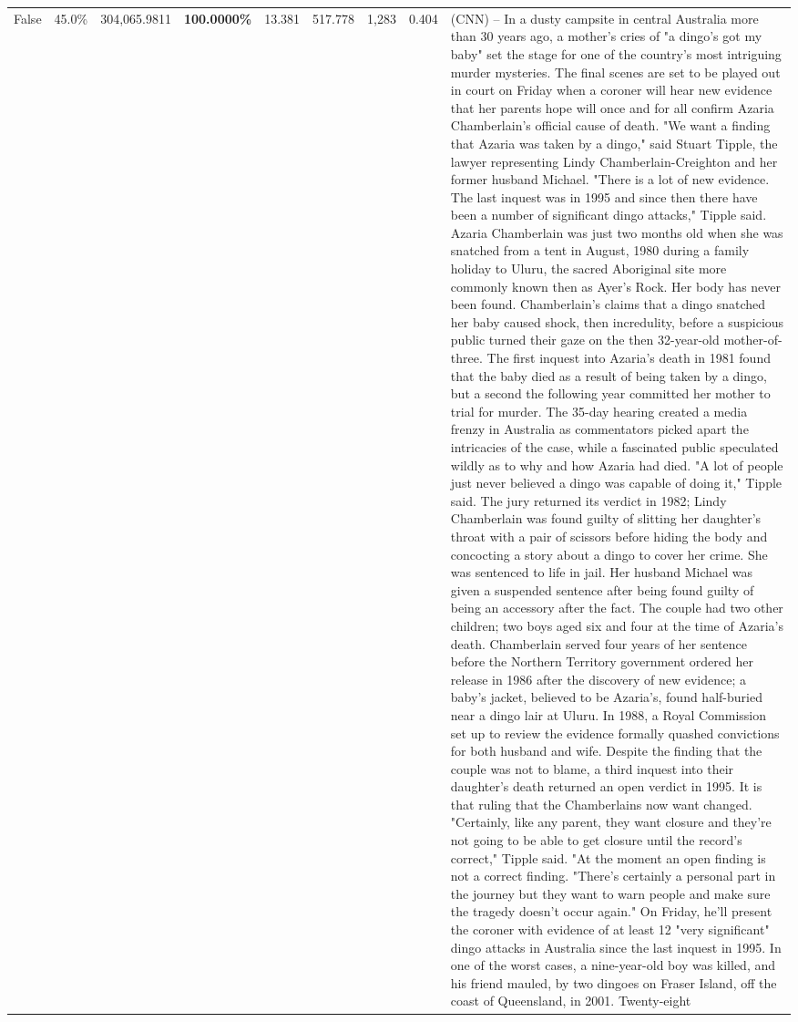 \begin{table}[H]
\begin{tabular}{lllrlllll}
False & 45.0\% & \color{red} 304,065.9811 & \bfseries \color{red} 100.0000\% & 13.381 & 517.778 & 1,283 & 0.404 & (CNN) -- In a dusty campsite in central Australia more than 30 years ago, a mother's cries of "a dingo's got my baby" set the stage for one of the country's most intriguing murder mysteries. The final scenes are set to be played out in court on Friday when a coroner will hear new evidence that her parents hope will once and for all confirm Azaria Chamberlain's official cause of death. "We want a finding that Azaria was taken by a dingo," said Stuart Tipple, the lawyer representing Lindy Chamberlain-Creighton and her former husband Michael. "There is a lot of new evidence. The last inquest was in 1995 and since then there have been a number of significant dingo attacks," Tipple said. Azaria Chamberlain was just two months old when she was snatched from a tent in August, 1980 during a family holiday to Uluru, the sacred Aboriginal site more commonly known then as Ayer's Rock. Her body has never been found. Chamberlain's claims that a dingo snatched her baby caused shock, then incredulity, before a suspicious public turned their gaze on the then 32-year-old mother-of-three. The first inquest into Azaria's death in 1981 found that the baby died as a result of being taken by a dingo, but a second the following year committed her mother to trial for murder. The 35-day hearing created a media frenzy in Australia as commentators picked apart the intricacies of the case, while a fascinated public speculated wildly as to why and how Azaria had died. "A lot of people just never believed a dingo was capable of doing it," Tipple said. The jury returned its verdict in 1982; Lindy Chamberlain was found guilty of slitting her daughter's throat with a pair of scissors before hiding the body and concocting a story about a dingo to cover her crime. She was sentenced to life in jail. Her husband Michael was given a suspended sentence after being found guilty of being an accessory after the fact. The couple had two other children; two boys aged six and four at the time of Azaria's death. Chamberlain served four years of her sentence before the Northern Territory government ordered her release in 1986 after the discovery of new evidence; a baby's jacket, believed to be Azaria's, found half-buried near a dingo lair at Uluru. In 1988, a Royal Commission set up to review the evidence formally quashed convictions for both husband and wife. Despite the finding that the couple was not to blame, a third inquest into their daughter's death returned an open verdict in 1995. It is that ruling that the Chamberlains now want changed. "Certainly, like any parent, they want closure and they're not going to be able to get closure until the record's correct," Tipple said. "At the moment an open finding is not a correct finding. "There's certainly a personal part in the journey but they want to warn people and make sure the tragedy doesn't occur again." On Friday, he'll present the coroner with evidence of at least 12 "very significant" dingo attacks in Australia since the last inquest in 1995. In one of the worst cases, a nine-year-old boy was killed, and his friend mauled, by two dingoes on Fraser Island, off the coast of Queensland, in 2001. Twenty-eight 
\end{tabular}
\end{table}
